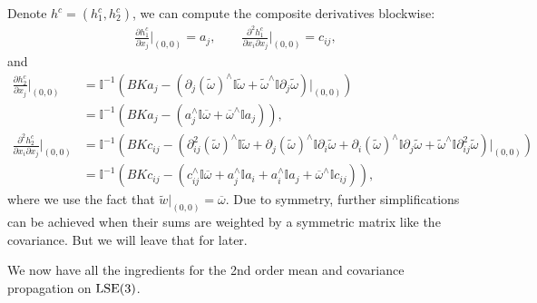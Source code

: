 \documentclass[12pt,class=article,crop=false]{standalone}
\begin{document}
Denote $ h^c = (h_1^c, h_2^c)$, we can compute the composite derivatives blockwise:
\begin{align*}
	\frac{\partial h_1^c}{\partial x_j}\bigg|_{(0,0)} = a_j, \qquad \frac{\partial^2 h_1^c}{\partial { x_i} \partial x_j} \bigg|_{(0,0)} = c_{ij},  
\end{align*}
and
\begin{align*}
	\frac{\partial h_2^c}{\partial x_j}\bigg|_{(0,0)} &= \mathbb{I} ^{-1} \left( BK a_j - \left( \partial_j( \widetilde{ \omega})^\wedge \mathbb{I}  \widetilde{ \omega} + \widetilde{ \omega}^\wedge \mathbb{I} \partial_j \widetilde{ \omega} \right)\big|_{(0,0)}  \right)  \\ 
	&= \mathbb{I} ^{-1}\left( BKa_j - \left( a_j^\wedge \mathbb{I} \overline{\omega} + \overline{\omega}^\wedge \mathbb{I} a_j \right)  \right)  ,\\
	\frac{\partial^2 h_2^c}{\partial { x_i} \partial x_j} \bigg|_{(0,0)} &= \mathbb{I} ^{-1} \left( BKc_{ij} - \left( \partial_{ij}^2(\widetilde{ \omega})^\wedge \mathbb{I} \widetilde{ \omega} + \partial_j(\widetilde{ \omega})^\wedge \mathbb{I} \partial_i\widetilde{ \omega} + \partial_i(\widetilde{ \omega})^\wedge \mathbb{I} \partial_j \widetilde{ \omega} + \widetilde{ \omega}^\wedge \mathbb{I} \partial_{ij}^2 \widetilde{ \omega} \right)\big|_{(0,0)}  \right)  \\
	&= \mathbb{I} ^{-1} \left( BK c_{ij} - \left( c_{ij}^\wedge \mathbb{I} \overline{\omega} + a_j^\wedge \mathbb{I} a_i + a_i^\wedge \mathbb{I} a_j + \overline{\omega}^\wedge \mathbb{I} c_{ij} \right)  \right)  ,
\end{align*}
 where we use the fact that $ \widetilde{ w}|_{(0,0)} = \overline{\omega}$. Due to symmetry, further simplifications can be achieved when their sums are weighted by a symmetric matrix like the covariance. But we will leave that for later.

We now have all the ingredients for the 2nd order mean and covariance propagation on $ \operatorname{LSE}(3)$.
\end{document}

